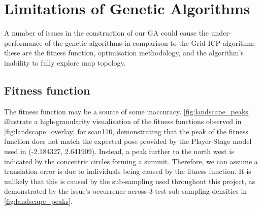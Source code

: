 \documentclass[authoryearcitations]{UoYCSproject}
\begin{document}
\section{Limitations of Genetic Algorithms}
\label{sec:algorithm_limitations}
A number of issues in the construction of our GA could cause the under-performance of the genetic algorithms in comparison to the Grid-ICP algorithm; these are the fitness function, optimisation methodology, and the algorithm's inability to fully explore map topology.

\subsection{Fitness function}
\label{subsec:criticism_fitness_func}
The fitness function may be a source of some inaccuracy. \autoref{fig:landscape_peaks} illustrate a high-granularity visualisation of the fitness functions observed in \autoref{fig:landscape_overlay} for scan110, demonstrating that the peak of the fitness function does not match the expected pose provided by the Player-Stage model used in \citet{Lenac2011-co}(-2.184327, 2.641909). Instead, a peak further to the north west is indicated by the concentric circles forming a summit. Therefore, we can assume a translation error is due to individuals being caused by the fitness function. It is unlikely that this is caused by the sub-sampling used throughout this project, as demonstrated by the issue's occurrence across 3 test sub-sampling densities in \autoref{fig:landscape_peaks}. \newline
\end{document}
